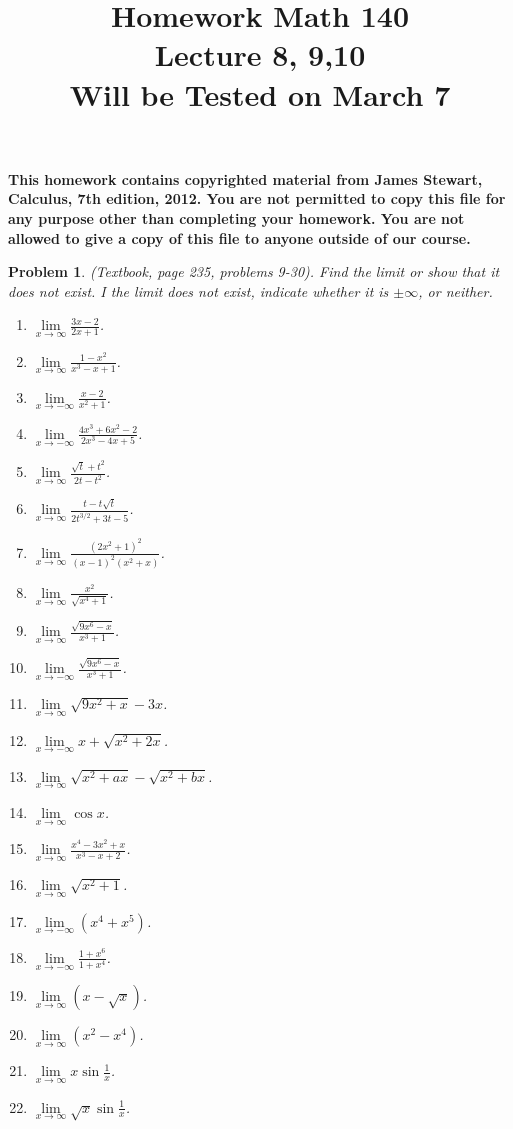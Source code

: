 \documentclass{article}
\date{}
\title{
Homework Math 140 \\
Lecture 8, 9,10 \\
Will be Tested on March 7
}
\newtheorem{problem}{Problem}
\begin{document}
\maketitle
\textbf{This homework contains copyrighted material from  James Stewart, Calculus, 7th edition, 2012. 
You are not permitted to copy this file for any purpose other than completing your homework. You are not allowed to give a copy of this file to anyone outside of our course. 
}
\begin{problem} (Textbook, page 235, problems 9-30).
Find the limit or show that it does not exist. I the limit does not exist, indicate whether it is $\pm\infty$, or neither. 
\begin{multicols}{3}
\begin{enumerate}
\item $\lim\limits_{x\to\infty }\frac{3x-2}{2x+1}$.
\item $\lim\limits_{x\to\infty }\frac{1-x^2}{x^3-x+1}$.
\item $\lim\limits_{x\to-\infty }\frac{x-2}{x^2+1}$.
\item $\lim\limits_{x\to-\infty }\frac{4x^3+6x^2-2}{2x^3-4x+5}$.
\item $\lim\limits_{x\to\infty }\frac{\sqrt{t}+t^2}{2t-t^2}$.
\item $\lim\limits_{x\to\infty }\frac{t-t\sqrt{t}}{2t^{3/2}+3t-5}$.
\item $\lim\limits_{x\to\infty }\frac{(2x^2+1)^2}{(x-1)^2(x^2+x)}$.
\item $\lim\limits_{x\to\infty }\frac{x^2}{\sqrt{x^4+1}}$.
\item $\lim\limits_{x\to\infty }\frac{\sqrt{9x^6-x}}{x^3+1}$.
\item $\lim\limits_{x\to-\infty }\frac{\sqrt{9x^6-x}}{x^3+1}$.
\item $\lim\limits_{x\to\infty}\sqrt{9x^2+x}-3x$.
\item $\lim\limits_{x\to-\infty}x+\sqrt{x^2+2x} $.
\item $\lim\limits_{x\to\infty}\sqrt{x^2+ax}-\sqrt{x^2+bx}$.
\item $\lim\limits_{x\to\infty}\cos x$.
\item $\lim\limits_{x\to\infty}\frac{x^4-3x^2+x}{x^3-x+2}$.
\item $\lim\limits_{x\to\infty}\sqrt{x^2+1}$.
\item $\lim\limits_{x\to-\infty}(x^4+x^5)$.
\item $\lim\limits_{x\to-\infty}\frac{1+x^6}{1+x^4}$.
\item $\lim\limits_{x\to\infty}(x-\sqrt{x})$.
\item $\lim\limits_{x\to\infty}(x^2-x^4)$.
\item $\lim\limits_{x\to\infty}x\sin \frac{1}{x}$.
\item $\lim\limits_{x\to\infty}\sqrt{x}\sin \frac{1}{x}$.
\end{enumerate}
\end{multicols}
\end{problem}
\end{document}
